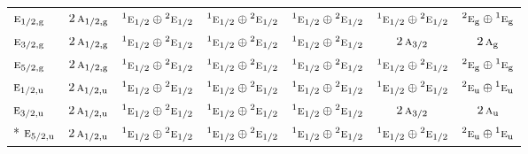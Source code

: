 \documentclass[10pt,a4paper]{article}
\numberwithin{equation}{section}
\newcommand{\irr}[1]{\text{\normalfont\scshape #1}}
\newcommand{\conjpair}[1]{{}^{#1}}
\newcommand{\ptag}[1]{\mathrm{#1}}
\begin{document}
{\begin{longtable}{@{}lcccccc@{}}
$\irr{e}_{1/2,\ptag{g}}$ & $2\,\irr{a}_{1/2,\ptag{g}}$ & $\conjpair{1}\irr{e}_{1/2}\oplus \conjpair{2}\irr{e}_{1/2}$ & $\conjpair{1}\irr{e}_{1/2}\oplus \conjpair{2}\irr{e}_{1/2}$ & $\conjpair{1}\irr{e}_{1/2}\oplus \conjpair{2}\irr{e}_{1/2}$ & $\conjpair{1}\irr{e}_{1/2}\oplus \conjpair{2}\irr{e}_{1/2}$ & $\conjpair{2}\irr{e}_{\ptag{g}}\oplus \conjpair{1}\irr{e}_{\ptag{g}}$\\
$\irr{e}_{3/2,\ptag{g}}$ & $2\,\irr{a}_{1/2,\ptag{g}}$ & $\conjpair{1}\irr{e}_{1/2}\oplus \conjpair{2}\irr{e}_{1/2}$ & $\conjpair{1}\irr{e}_{1/2}\oplus \conjpair{2}\irr{e}_{1/2}$ & $\conjpair{1}\irr{e}_{1/2}\oplus \conjpair{2}\irr{e}_{1/2}$ & $2\,\irr{a}_{3/2}$ & $2\,\irr{a}_{\ptag{g}}$\\
$\irr{e}_{5/2,\ptag{g}}$ & $2\,\irr{a}_{1/2,\ptag{g}}$ & $\conjpair{1}\irr{e}_{1/2}\oplus \conjpair{2}\irr{e}_{1/2}$ & $\conjpair{1}\irr{e}_{1/2}\oplus \conjpair{2}\irr{e}_{1/2}$ & $\conjpair{1}\irr{e}_{1/2}\oplus \conjpair{2}\irr{e}_{1/2}$ & $\conjpair{1}\irr{e}_{1/2}\oplus \conjpair{2}\irr{e}_{1/2}$ & $\conjpair{2}\irr{e}_{\ptag{g}}\oplus \conjpair{1}\irr{e}_{\ptag{g}}$\\
$\irr{e}_{1/2,\ptag{u}}$ & $2\,\irr{a}_{1/2,\ptag{u}}$ & $\conjpair{1}\irr{e}_{1/2}\oplus \conjpair{2}\irr{e}_{1/2}$ & $\conjpair{1}\irr{e}_{1/2}\oplus \conjpair{2}\irr{e}_{1/2}$ & $\conjpair{1}\irr{e}_{1/2}\oplus \conjpair{2}\irr{e}_{1/2}$ & $\conjpair{1}\irr{e}_{1/2}\oplus \conjpair{2}\irr{e}_{1/2}$ & $\conjpair{2}\irr{e}_{\ptag{u}}\oplus \conjpair{1}\irr{e}_{\ptag{u}}$\\
$\irr{e}_{3/2,\ptag{u}}$ & $2\,\irr{a}_{1/2,\ptag{u}}$ & $\conjpair{1}\irr{e}_{1/2}\oplus \conjpair{2}\irr{e}_{1/2}$ & $\conjpair{1}\irr{e}_{1/2}\oplus \conjpair{2}\irr{e}_{1/2}$ & $\conjpair{1}\irr{e}_{1/2}\oplus \conjpair{2}\irr{e}_{1/2}$ & $2\,\irr{a}_{3/2}$ & $2\,\irr{a}_{\ptag{u}}$\\*
$\irr{e}_{5/2,\ptag{u}}$ & $2\,\irr{a}_{1/2,\ptag{u}}$ & $\conjpair{1}\irr{e}_{1/2}\oplus \conjpair{2}\irr{e}_{1/2}$ & $\conjpair{1}\irr{e}_{1/2}\oplus \conjpair{2}\irr{e}_{1/2}$ & $\conjpair{1}\irr{e}_{1/2}\oplus \conjpair{2}\irr{e}_{1/2}$ & $\conjpair{1}\irr{e}_{1/2}\oplus \conjpair{2}\irr{e}_{1/2}$ & $\conjpair{2}\irr{e}_{\ptag{u}}\oplus \conjpair{1}\irr{e}_{\ptag{u}}$\\
\bottomrule\end{longtable}}
\end{document}
